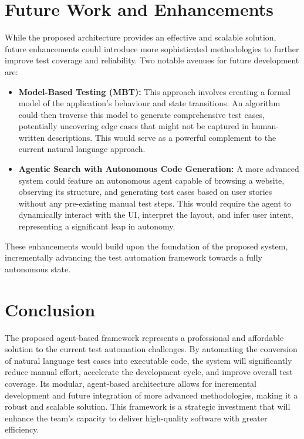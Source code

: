 \documentclass{article}
\begin{document}
\section{Future Work and Enhancements}
While the proposed architecture provides an effective and scalable solution, future enhancements could introduce more sophisticated methodologies to further improve test coverage and reliability. Two notable avenues for future development are:
\begin{itemize}
    \item \textbf{Model-Based Testing (MBT):} This approach involves creating a formal model of the application's behaviour and state transitions. An algorithm could then traverse this model to generate comprehensive test cases, potentially uncovering edge cases that might not be captured in human-written descriptions. This would serve as a powerful complement to the current natural language approach.
    \item \textbf{Agentic Search with Autonomous Code Generation:} A more advanced system could feature an autonomous agent capable of browsing a website, observing its structure, and generating test cases based on user stories without any pre-existing manual test steps. This would require the agent to dynamically interact with the UI, interpret the layout, and infer user intent, representing a significant leap in autonomy.
\end{itemize}
These enhancements would build upon the foundation of the proposed system, incrementally advancing the test automation framework towards a fully autonomous state.

\section{Conclusion}
The proposed agent-based framework represents a professional and affordable solution to the current test automation challenges. By automating the conversion of natural language test cases into executable code, the system will significantly reduce manual effort, accelerate the development cycle, and improve overall test coverage. Its modular, agent-based architecture allows for incremental development and future integration of more advanced methodologies, making it a robust and scalable solution. This framework is a strategic investment that will enhance the team's capacity to deliver high-quality software with greater efficiency.
\end{document}
